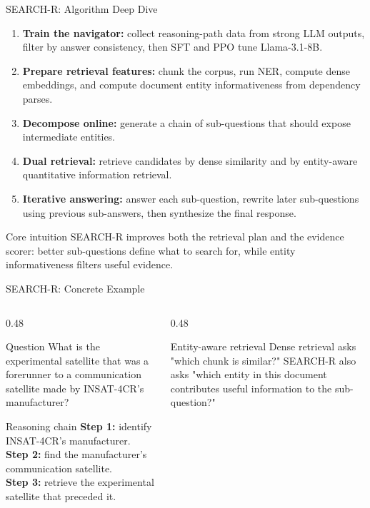 
\begin{frame}{SEARCH-R: Algorithm Deep Dive}
\scriptsize
\begin{enumerate}
  \item \textbf{Train the navigator:} collect reasoning-path data from strong LLM outputs, filter by answer consistency, then SFT and PPO tune Llama-3.1-8B.
  \item \textbf{Prepare retrieval features:} chunk the corpus, run NER, compute dense embeddings, and compute document entity informativeness from dependency parses.
  \item \textbf{Decompose online:} generate a chain of sub-questions that should expose intermediate entities.
  \item \textbf{Dual retrieval:} retrieve candidates by dense similarity and by entity-aware quantitative information retrieval.
  \item \textbf{Iterative answering:} answer each sub-question, rewrite later sub-questions using previous sub-answers, then synthesize the final response.
\end{enumerate}
\begin{block}{Core intuition}
SEARCH-R improves both the retrieval plan and the evidence scorer: better sub-questions define what to search for, while entity informativeness filters useful evidence.
\end{block}
\end{frame}

\begin{frame}{SEARCH-R: Concrete Example}
\scriptsize
\begin{columns}[T,onlytextwidth]
  \begin{column}{0.48\textwidth}
    \begin{block}{Question}
      What is the experimental satellite that was a forerunner to a communication satellite made by INSAT-4CR's manufacturer?
    \end{block}
    \begin{block}{Reasoning chain}
      \textbf{Step 1:} identify INSAT-4CR's manufacturer.\\
      \textbf{Step 2:} find the manufacturer's communication satellite.\\
      \textbf{Step 3:} retrieve the experimental satellite that preceded it.
    \end{block}
  \end{column}
  \begin{column}{0.48\textwidth}
    \begin{block}{Entity-aware retrieval}
      Dense retrieval asks "which chunk is similar?" SEARCH-R also asks "which entity in this document contributes useful information to the sub-question?"
    \end{block}
  \end{column}
\end{columns}
\end{frame}

